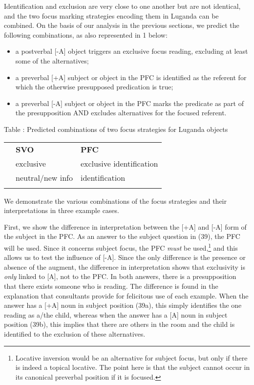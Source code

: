 \documentclass[output=paper]{langsci/langscibook}
\begin{document}
Identification and exclusion are very close to one another but are not identical, and the two focus marking strategies encoding them in Luganda can be combined. On the basis of our analysis in the previous sections, we predict the following combinations, as also represented in 1 below:

\begin{itemize}
 \item a postverbal [-A] object triggers an exclusive focus reading, excluding at least some of the alternatives;
 \item a preverbal [+A] subject or object in the PFC is identified as the referent for which the otherwise presupposed predication is true;
 \item a preverbal [-A] subject or object in the PFC marks the predicate as part of the presupposition AND excludes alternatives for the focused referent.
\end{itemize} 

\begin{table}
 Table : Predicted combinations of two focus strategies for Luganda objects

\begin{tabularx}{\textwidth}{XXX} & {\mdseries \textbf{SVO}} & {\mdseries \textbf{PFC}}\\
\lsptoprule
{\mdseries [-A]} & {\mdseries exclusive} & {\mdseries exclusive identification}\\
{\mdseries [+A]} & {\mdseries neutral/new info} & {\mdseries identification}\\
\lspbottomrule
\end{tabularx}
\end{table}

We demonstrate the various combinations of the focus strategies and their interpretations in three example cases.

  First, we show the difference in interpretation between the [+A] and [-A] form of the subject in the PFC. As an answer to the subject question in (39), the PFC will be used. Since it concerns subject focus, the PFC \textit{must} be used,\footnote{ Locative inversion would be an alternative for subject focus, but only if there is indeed a topical locative. The point here is that the subject cannot occur in its canonical preverbal position if it is focused.} and this allows us to test the influence of [-A]. Since the only difference is the presence or absence of the augment, the difference in interpretation shows that exclusivity is \textit{only} linked to [A], not to the PFC. In both answers, there is a presupposition that there exists someone who is reading. The difference is found in the explanation that consultants provide for felicitous use of each example. When the answer has a [+A] noun in subject position (39a), this simply identifies the one reading as a/the child, whereas when the answer has a [A] noun in subject position (39b), this implies that there are others in the room and the child is identified to the exclusion of these alternatives.
\end{document}
